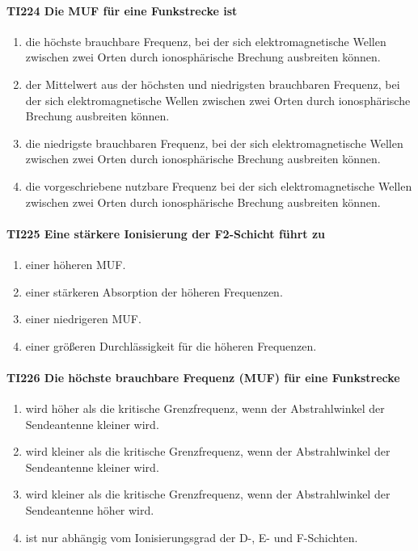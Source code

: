 \documentclass[8pt]{article}
\begin{document}
\paragraph*{TI224 Die MUF für eine Funkstrecke ist} 
\begin{enumerate}[nolistsep,label=\Alph*]
\item die höchste brauchbare Frequenz, bei der sich elektromagnetische Wellen zwischen zwei Orten durch ionosphärische Brechung ausbreiten können.
\item der Mittelwert aus der höchsten und niedrigsten brauchbaren Frequenz, bei der sich elektromagnetische Wellen zwischen zwei Orten durch ionosphärische Brechung ausbreiten können.
\item die niedrigste brauchbaren Frequenz, bei der sich elektromagnetische Wellen zwischen zwei Orten durch ionosphärische Brechung ausbreiten können.
\item die vorgeschriebene nutzbare Frequenz bei der sich elektromagnetische Wellen zwischen zwei Orten durch ionosphärische Brechung ausbreiten können.
\end{enumerate}

\paragraph*{TI225 Eine stärkere Ionisierung der F2-Schicht führt zu} 
\begin{enumerate}[nolistsep,label=\Alph*]
\item einer höheren MUF.
\item einer stärkeren Absorption der höheren Frequenzen.
\item einer niedrigeren MUF.
\item einer größeren Durchlässigkeit für die höheren Frequenzen.
\end{enumerate}

\paragraph*{TI226 Die höchste brauchbare Frequenz (MUF) für eine Funkstrecke}
\begin{enumerate}[nolistsep,label=\Alph*]
\item wird höher als die kritische Grenzfrequenz, wenn der Abstrahlwinkel der Sendeantenne kleiner wird.
\item wird kleiner als die kritische Grenzfrequenz, wenn der Abstrahlwinkel der Sendeantenne kleiner wird.
\item wird kleiner als die kritische Grenzfrequenz, wenn der Abstrahlwinkel der Sendeantenne höher wird.
\item ist nur abhängig vom Ionisierungsgrad der D-, E- und F-Schichten.
\end{enumerate}
\end{document}

